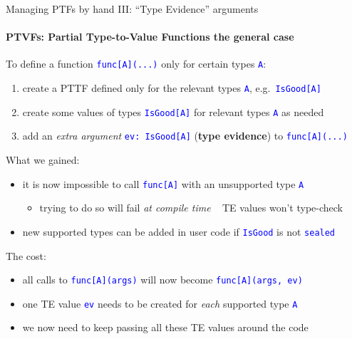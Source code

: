 \documentclass[english]{beamer}
\begin{document}
\begin{frame}{Managing PTFs by hand III: ``Type Evidence'' arguments}


\framesubtitle{PTVFs: Partial Type-to-Value Functions \textendash{} the general
case}

To define a function \texttt{\textcolor{blue}{\footnotesize{}func{[}A{]}(...)}}
only for certain types \texttt{\textcolor{blue}{\footnotesize{}A}}:
\begin{enumerate}
\item create a PTTF defined only for the relevant types \texttt{\textcolor{blue}{\footnotesize{}A}},
e.g.\ \texttt{\textcolor{blue}{\footnotesize{}IsGood{[}A{]}}} \ 
\item create some values of types \texttt{\textcolor{blue}{\footnotesize{}IsGood{[}A{]}}}
for relevant types \texttt{\textcolor{blue}{\footnotesize{}A}} as
needed
\item add an \emph{extra argument} \texttt{\textcolor{blue}{\footnotesize{}ev:\ IsGood{[}A{]}}}
(\textbf{type evidence}) to \texttt{\textcolor{blue}{\footnotesize{}func{[}A{]}(...)}}\ 
\end{enumerate}
What we gained:
\begin{itemize}
\item it is now impossible to call \texttt{\textcolor{blue}{\footnotesize{}func{[}A{]}}}
with an unsupported type \texttt{\textcolor{blue}{\footnotesize{}A}}{\footnotesize \par}
\begin{itemize}
\item trying to do so will fail \emph{at compile time} \ \textendash{}
TE values won't type-check
\end{itemize}
\item new supported types can be added in user code if \texttt{\textcolor{blue}{\footnotesize{}IsGood}}
is not \texttt{\textcolor{blue}{\footnotesize{}sealed}}{\footnotesize \par}
\end{itemize}
The cost:
\begin{itemize}
\item all calls to \texttt{\textcolor{blue}{\footnotesize{}func{[}A{]}(args)}}
will now become \texttt{\textcolor{blue}{\footnotesize{}func{[}A{]}(args,
ev)}}{\footnotesize \par}
\item one TE value \texttt{\textcolor{blue}{\footnotesize{}ev}} needs to
be created for \emph{each} supported type \texttt{\textcolor{blue}{\footnotesize{}A}}\ 
\item we now need to keep passing all these TE values around the code

\end{itemize}
\end{frame}
\end{document}
